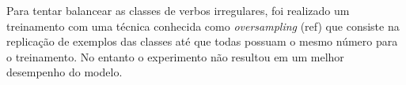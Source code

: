 Para tentar balancear as classes de verbos irregulares, foi realizado um treinamento com uma técnica conhecida como \textit{oversampling} (ref) que consiste na replicação de exemplos das classes até que todas possuam o mesmo número para o treinamento. No entanto o experimento não resultou em um melhor desempenho do modelo. 






